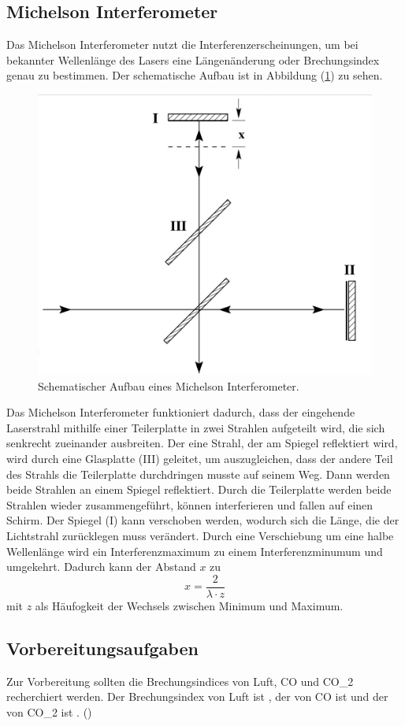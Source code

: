 \subsection{Michelson Interferometer}
Das Michelson Interferometer nutzt die Interferenzerscheinungen, um bei bekannter Wellenlänge des Lasers eine Längenänderung oder Brechungsindex 
genau zu bestimmen. Der schematische Aufbau ist in Abbildung (\ref{fig:Aufbau}) zu sehen. 
\begin{figure}[H]
    \centering
    \includegraphics[width=0.6\linewidth]{"content/Bilder/V401.png"}
    \caption{Schematischer Aufbau eines Michelson Interferometer.}
    \label{fig:Aufbau}
\end{figure}
Das Michelson Interferometer funktioniert dadurch, dass der eingehende Laserstrahl mithilfe einer Teilerplatte in zwei Strahlen aufgeteilt wird, die sich senkrecht 
zueinander ausbreiten. Der eine Strahl, der am Spiegel reflektiert wird, wird durch eine Glasplatte (III) geleitet, um auszugleichen, dass der andere Teil des Strahls
die Teilerplatte durchdringen musste auf seinem Weg. Dann werden beide Strahlen an einem Spiegel reflektiert. Durch die Teilerplatte werden beide Strahlen wieder 
zusammengeführt, können interferieren und fallen auf einen Schirm. Der Spiegel (I) kann verschoben werden, wodurch sich die Länge, die der Lichtstrahl zurücklegen 
muss verändert. Durch eine Verschiebung um eine halbe Wellenlänge wird ein Interferenzmaximum zu einem Interferenzminumum und umgekehrt. Dadurch kann 
der Abstand $x$ zu 
\begin{equation}
    x = \frac{2}{\lambda \cdot z}
\end{equation}
mit $z$ als Häufogkeit der Wechsels zwischen Minimum und Maximum. 
\subsection{Vorbereitungsaufgaben}
\label{sec:Vorbereitungsaufgaben}
Zur Vorbereitung sollten die Brechungsindices von Luft, CO und CO_2 recherchiert werden. Der Brechungsindex von Luft ist , der von CO ist und der von CO_2 ist . 
\left(\right)
